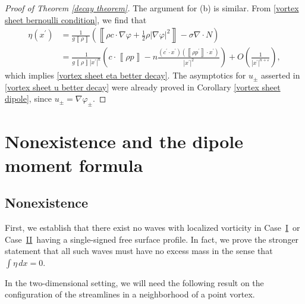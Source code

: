 \documentclass[11pt,reqno]{amsart}
\newcommand{\I}{\texorpdfstring{\hyperref[sec non-singular]{I}}{I}}
\newcommand{\VS}{\texorpdfstring{\hyperref[sec sheets]{II}}{II}}
\newcommand{\jump}[1]{\left\llbracket{#1}\right\rrbracket}
\theoremstyle{plain}
\theoremstyle{remark}
\numberwithin{equation}{section}
\begin{document}
\begin{proof}[Proof of Theorem \ref{decay theorem}]
The argument for (b) is similar.  From \eqref{vortex sheet bernoulli condition}, we find that 
\begin{align*}
\eta(x^\prime) & = \frac{1}{g\jump{\rho}} \left( \jump{\rho c\cdot \nabla \varphi + \frac{1}{2} \rho |\nabla \varphi|^2} - \sigma \nabla \cdot N  \right) \\
&= \frac{1}{g\jump{\rho} |x^\prime|^n} \left( c \cdot \jump{\rho p} - n  \frac{(c^\prime \cdot x^\prime)( \jump{\rho p^\prime} \cdot x^\prime)}{|x^\prime|^2} \right) + O\left( \frac{1}{|x^\prime|^{n+\varepsilon}} \right),
\end{align*}
which implies \eqref{vortex sheet eta better decay}.  The asymptotics for $u_\pm$ asserted in \eqref{vortex sheet u better decay} were already proved in Corollary \ref{vortex sheet dipole}, since $u_\pm = \nabla \varphi_\pm$.  
\end{proof}



\section{Nonexistence and the dipole moment formula}

\subsection{Nonexistence}
First, we establish that there exist no waves with localized vorticity in Case~\I\ or Case~\VS\ having a single-signed free surface profile.  In fact, we prove the stronger statement that all such waves must have no excess mass in the sense that $\int \eta\,dx =0$.   

In the two-dimensional setting, we will need the following result on the configuration of the streamlines in a neighborhood of a point vortex.  
 
\end{document}
